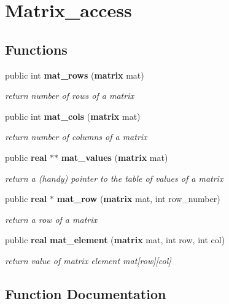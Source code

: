\section{Matrix\_\-access}
\label{group__matrix__access}
\subsection*{Functions}
\begin{CompactItemize}
\item 
public int {\bf mat\_\-rows} ({\bf matrix} mat)
\begin{CompactList}\small\item\em return number of rows of a matrix\item\end{CompactList}\item 
public int {\bf mat\_\-cols} ({\bf matrix} mat)
\begin{CompactList}\small\item\em return number of columns of a matrix\item\end{CompactList}\item 
public {\bf real} $\ast$$\ast$ {\bf mat\_\-values} ({\bf matrix} mat)
\begin{CompactList}\small\item\em return a (handy) pointer to the table of values of a matrix\item\end{CompactList}\item 
public {\bf real} $\ast$ {\bf mat\_\-row} ({\bf matrix} mat, int row\_\-number)
\begin{CompactList}\small\item\em return a row of a matrix\item\end{CompactList}\item 
public {\bf real} {\bf mat\_\-element} ({\bf matrix} mat, int row, int col)
\begin{CompactList}\small\item\em return value of matrix element mat[row][col]\item\end{CompactList}\end{CompactItemize}


\subsection{Function Documentation}
